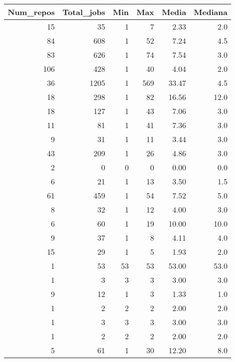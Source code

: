 \begin{tabular}{rrrrrr}
\toprule
 Num\_repos &  Total\_jobs &  Min &  Max &  Media &  Mediana \\
\midrule
        15 &          35 &    1 &    7 &   2.33 &      2.0 \\
        84 &         608 &    1 &   52 &   7.24 &      4.5 \\
        83 &         626 &    1 &   74 &   7.54 &      3.0 \\
       106 &         428 &    1 &   40 &   4.04 &      2.0 \\
        36 &        1205 &    1 &  569 &  33.47 &      4.5 \\
        18 &         298 &    1 &   82 &  16.56 &     12.0 \\
        18 &         127 &    1 &   43 &   7.06 &      3.0 \\
        11 &          81 &    1 &   41 &   7.36 &      3.0 \\
         9 &          31 &    1 &   11 &   3.44 &      3.0 \\
        43 &         209 &    1 &   26 &   4.86 &      3.0 \\
         2 &           0 &    0 &    0 &   0.00 &      0.0 \\
         6 &          21 &    1 &   13 &   3.50 &      1.5 \\
        61 &         459 &    1 &   54 &   7.52 &      5.0 \\
         8 &          32 &    1 &   12 &   4.00 &      3.0 \\
         6 &          60 &    1 &   19 &  10.00 &     10.0 \\
         9 &          37 &    1 &    8 &   4.11 &      4.0 \\
        15 &          29 &    1 &    5 &   1.93 &      2.0 \\
         1 &          53 &   53 &   53 &  53.00 &     53.0 \\
         1 &           3 &    3 &    3 &   3.00 &      3.0 \\
         9 &          12 &    1 &    3 &   1.33 &      1.0 \\
         1 &           2 &    2 &    2 &   2.00 &      2.0 \\
         1 &           3 &    3 &    3 &   3.00 &      3.0 \\
         1 &           2 &    2 &    2 &   2.00 &      2.0 \\
         5 &          61 &    1 &   30 &  12.20 &      8.0 \\

\end{tabular}
